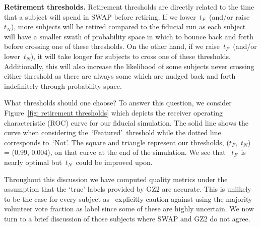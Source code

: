 \documentclass[twocolumn]{aastex6}
\newcommand{\tf}{$t_F$}
\newcommand{\tn}{$t_N$}
\newcommand{\feat}{`Featured'}
\newcommand{\notfeat}{`Not'}
\begin{document}


\textbf{Retirement thresholds.}
Retirement thresholds are directly related to the time that a subject will spend
in SWAP before retiring.  If we lower~\tf~(and/or raise~\tn), more subjects will be retired
compared to the fiducial run as each subject will have a smaller swath of probability space
in which to bounce back and forth before crossing one of these thresholds.
On the other hand, if we raise~\tf~(and/or lower~\tn), it will take longer for subjects
to cross one of these thresholds. Additionally, this will also increase the likelihood of
some subjects never crossing either threshold as there are always some 
which are nudged back and forth indefinitely through probability space.


What thresholds should one choose? To answer this question, we consider
Figure~\ref{fig: retirement thresholds} which depicts the receiver operating 
characteristic (ROC) curve for our fiducial simulation. The solid line shows the 
curve when considering the~\feat~threshold  while the dotted line
corresponds to~\notfeat. The square and triangle represent our thresholds, 
(\tf,~\tn) = (0.99, 0.004), on that curve at the end of the simulation.  We see that 
~\tf~is nearly optimal but~\tn~could be improved upon. 


Throughout this discussion we have computed quality metrics under the assumption
that the `true' labels provided by GZ2 are accurate. 
This is unlikely to be the case for every subject as~\cite{Willett2013} explicitly caution against using 
the majority volunteer vote fraction as label since some of these are highly uncertain. 
We now turn to a brief discussion of those subjects where SWAP and GZ2 do not agree. 




\end{document}
